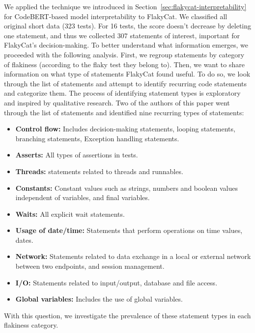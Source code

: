 We applied the technique we introduced in Section~\ref{sec:flakycat-interpretability} for CodeBERT-based model interpretability to FlakyCat. 
We classified all original short data (323 tests). For 16 tests, the score doesn't decrease by deleting one statement, and thus we collected 307 statements of interest, important for FlakyCat's decision-making.
To better understand what information emerges, we proceeded with the following analysis. First, we regroup statements by category of flakiness (according to the flaky test they belong to). Then, we want to share information on what type of statements FlakyCat found useful. To do so, we look through the list of statements and attempt to identify recurring code statements and categorize them. The process of identifying statement types is exploratory and inspired by qualitative research. Two of the authors of this paper went through the list of statements and identified nine recurring types of statements:
\begin{itemize}
 \item \textbf{Control flow:} Includes decision-making statements, looping statements, branching statements, Exception handling statements.
 \item \textbf{Asserts:} All types of assertions in tests. 
 \item \textbf{Threads:} statements related to threads and runnables. 
 \item \textbf{Constants:} Constant values such as strings, numbers and boolean values independent of variables, and final variables. 
 \item \textbf{Waits:} All explicit wait statements. 
 \item \textbf{Usage of date/time:} Statements that perform operations on time values, dates. 
 \item \textbf{Network:} Statements related to data exchange in a local or external network between two endpoints, and session management. 
 \item \textbf{I/O:} Statements related to input/output, database and file access. 
 \item \textbf{Global variables:} Includes the use of global variables. 
\end{itemize}

With this question, we investigate the prevalence of these statement types in each flakiness category.